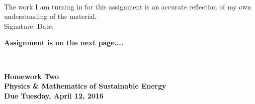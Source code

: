 \documentclass[11pt]{article}
\begin{document}
\\

\bigskip
\bigskip
\bigskip
\bigskip
\noindent The work I am turning in for this assignment is an accurate
reflection of my own understanding of the material.\\[14pt]

\noindent Signature: \underline{\hspace{7cm}} \hspace{1cm} Date:
\underline{\hspace{5cm}} 

{\bf Assignment is on the next page....}

\hspace{2mm}\\
\newpage
\begin{center}
{\Large {\bf Homework Two}}\\
\smallskip
{\large {\bf Physics \& Mathematics of Sustainable Energy}}\\
\smallskip
{ {\bf Due Tuesday, April 12, 2016}}\\
\end{center}
\end{document}
